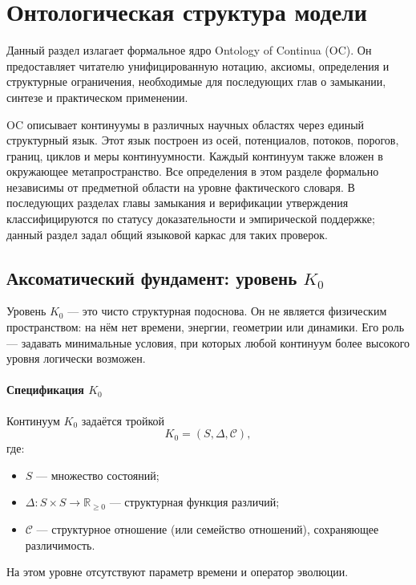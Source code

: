 
\section{Онтологическая структура модели}
\label{sec:model}

Данный раздел излагает формальное ядро Ontology of Continua (OC). Он предоставляет читателю
унифицированную нотацию, аксиомы, определения и структурные ограничения, необходимые для
последующих глав о замыкании, синтезе и практическом применении.

OC описывает континуумы в различных научных областях через единый структурный язык.
Этот язык построен из осей, потенциалов, потоков, порогов, границ, циклов и меры
континуумности. Каждый континуум также вложен в окружающее метапространство.
Все определения в этом разделе формально независимы от предметной области на уровне
фактического словаря. В последующих разделах главы замыкания и верификации утверждения
классифицируются по статусу доказательности и эмпирической поддержке; данный раздел
задал общий языковой каркас для таких проверок.

\subsection{Аксоматический фундамент: уровень \texorpdfstring{$K_0$}{K\_0}}

Уровень \(K_0\) — это чисто структурная подоснова.
Он не является физическим пространством: на нём нет времени, энергии, геометрии или динамики.
Его роль — задавать минимальные условия, при которых любой континуум более высокого уровня
логически возможен.

\paragraph{Спецификация \texorpdfstring{\(K_0\)}{K\_0}}
Континуум \(K_0\) задаётся тройкой
\[
    K_0 = (S,\Delta,\mathcal{C}),
\]
где:
\begin{itemize}
    \item \(S\) — множество состояний;
    \item \(\Delta : S \times S \to \mathbb{R}_{\ge 0}\) — структурная функция различий;
    \item \(\mathcal{C}\) — структурное отношение (или семейство отношений), сохраняющее различимость.
\end{itemize}
На этом уровне отсутствуют параметр времени и оператор эволюции.


